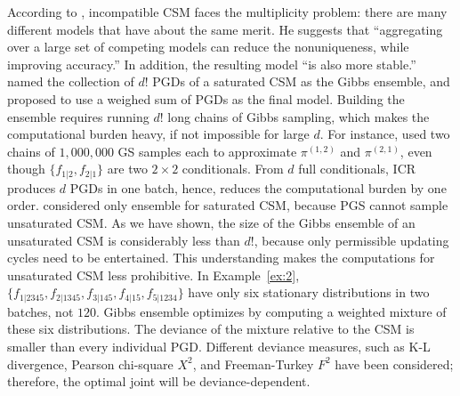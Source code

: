 \documentclass[12pt,a4paper]{article}
\begin{document}
According to \citet{Breiman2001}, incompatible CSM faces the multiplicity problem:
there are many different models that have about the same merit.
He suggests that ``aggregating over a large set of competing models can
reduce the nonuniqueness, while improving accuracy.''
In addition, the resulting model ``is also more stable.'' \citep[p.~206]{Breiman2001}
\citet{Chen2013} named
the collection of $d!$ PGDs of a saturated CSM as the Gibbs ensemble, and proposed to use a weighed sum of PGDs as the final model. Building the ensemble requires running $d!$ long chains of Gibbs sampling, which makes the computational burden  heavy, if not impossible for large $d$.   For instance, \citet{Chen2015} used two chains of $1,000,000$ GS samples each to approximate $\pi^{(1,2)}$ and $\pi^{(2,1)}$, even though $\{f_{1|2}, f_{2|1}\}$ are two $2 \times 2$  conditionals.
From $d$ full conditionals, ICR produces $d$ PGDs in one batch, hence,  reduces the computational burden by one order.    \citet{Chen2013} considered only  ensemble for saturated CSM, because PGS cannot sample   unsaturated CSM.   As we have shown, the size of the Gibbs ensemble of an unsaturated CSM is considerably less than $d!$, because only permissible updating cycles need to be entertained.  This understanding makes the computations for unsaturated CSM less prohibitive.
In Example~\ref{ex:2}, $\{f_{1|2345},f_{2|1345},f_{3|145},f_{4|15},f_{5|1234}\}$ have only six stationary distributions
in two batches, not $120$.  Gibbs ensemble  optimizes by computing a weighted mixture of these six distributions.
The deviance of the mixture relative to the CSM is smaller than every individual PGD.  Different deviance measures, such as K-L divergence, Pearson chi-square $X^2$, and Freeman-Turkey $F^2$ have been considered; therefore, the optimal joint will be deviance-dependent.
\end{document}
